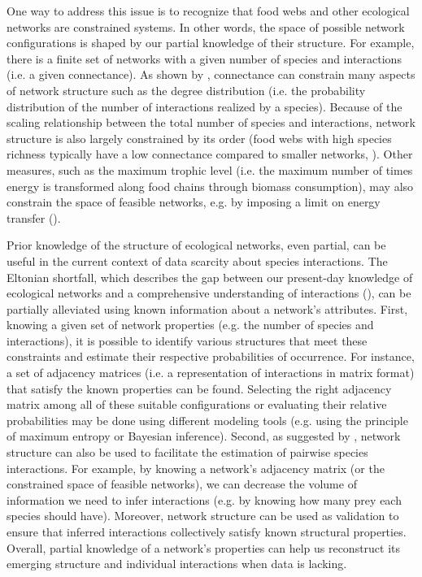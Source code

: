 One way to address this issue is to recognize that food webs and other
ecological networks are constrained systems. In other words, the space of
possible network configurations is shaped by our partial knowledge of their
structure. For example, there is a finite set of networks with a given number of
species and interactions (i.e. a given connectance). As shown by
\cite{Poisot2014When}, connectance can constrain many aspects of network
structure such as the degree distribution (i.e. the probability distribution of
the number of interactions realized by a species). Because of the scaling
relationship between the total number of species and interactions, network
structure is also largely constrained by its order (food webs with high species
richness typically have a low connectance compared to smaller networks,
\cite{MacDonald2020Revisiting}). Other measures, such as the maximum trophic level
(i.e. the maximum number of times energy is transformed along food chains
through biomass consumption), may also constrain the space of feasible networks,
e.g. by imposing a limit on energy transfer (\cite{Williams2004Limits}). 

Prior knowledge of the structure of ecological networks, even partial, can be
useful in the current context of data scarcity about species interactions. The
Eltonian shortfall, which describes the gap between our present-day knowledge of
ecological networks and a comprehensive understanding of interactions
(\cite{Hortal2015Seven}), can be partially alleviated using known information
about a network's attributes. First, knowing a given set of network properties
(e.g. the number of species and interactions), it is possible to identify
various structures that meet these constraints and estimate their respective
probabilities of occurrence. For instance, a set of adjacency matrices (i.e. a
representation of interactions in matrix format) that satisfy the known
properties can be found. Selecting the right adjacency matrix among all of these
suitable configurations or evaluating their relative probabilities may be done
using different modeling tools (e.g. using the principle of maximum entropy or
Bayesian inference). Second, as suggested by \cite{Strydom2021Roadmapa}, network
structure can also be used to facilitate the estimation of pairwise species
interactions. For example, by knowing a network's adjacency matrix (or the
constrained space of feasible networks), we can decrease the volume of
information we need to infer interactions (e.g. by knowing how many prey each
species should have). Moreover, network structure can be used as validation to
ensure that inferred interactions collectively satisfy known structural
properties. Overall, partial knowledge of a network's properties can help us
reconstruct its emerging structure and individual interactions when data is
lacking. 

